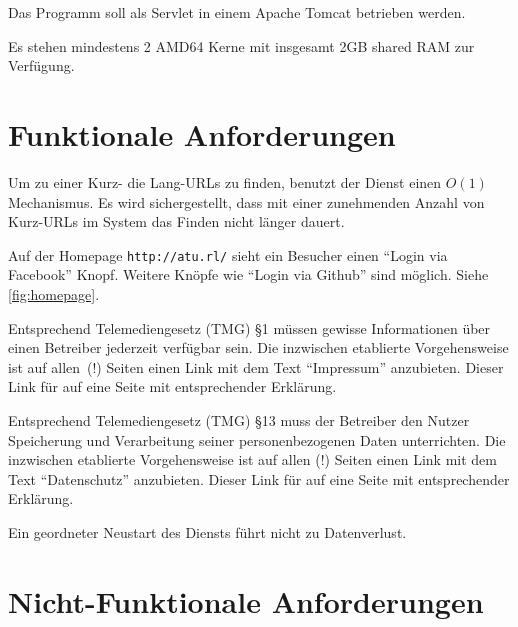 \documentclass[parskip=full,11pt,twoside]{scrartcl}
\begin{document}
Das Programm soll als Servlet in einem Apache Tomcat betrieben werden.

Es stehen mindestens 2 AMD64 Kerne mit insgesamt 2GB shared RAM zur Verfügung.

\section{Funktionale Anforderungen}


Um zu einer Kurz- die Lang-URLs zu finden,
benutzt der Dienst einen $O(1)$ Mechanismus.
Es wird sichergestellt,
dass mit einer zunehmenden Anzahl von Kurz-URLs im System
das Finden nicht länger dauert.


Auf der Homepage \texttt{http://atu.rl/} sieht ein Besucher
einen \enquote{Login via Facebook} Knopf.
Weitere Knöpfe wie \enquote{Login via Github} sind möglich.
Siehe \cref{fig:homepage}.


Entsprechend Telemediengesetz (TMG) §1
müssen gewisse Informationen über einen Betreiber jederzeit verfügbar sein.
Die inzwischen etablierte Vorgehensweise ist auf allen~(!) Seiten
einen Link mit dem Text \enquote{Impressum} anzubieten.
Dieser Link für auf eine Seite mit entsprechender Erklärung.


Entsprechend Telemediengesetz (TMG) §13
muss der Betreiber den Nutzer Speicherung und Verarbeitung seiner personenbezogenen Daten unterrichten.
Die inzwischen etablierte Vorgehensweise ist auf allen (!) Seiten
einen Link mit dem Text \enquote{Datenschutz} anzubieten.
Dieser Link für auf eine Seite mit entsprechender Erklärung.


Ein geordneter Neustart des Diensts führt nicht zu Datenverlust.

\section{Nicht-Funktionale Anforderungen}
\end{document}
